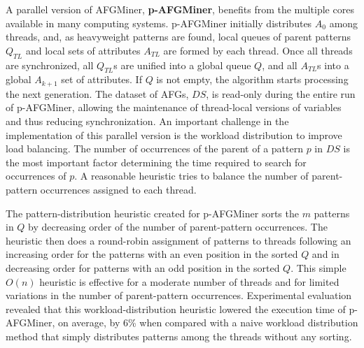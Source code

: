 A parallel version of AFGMiner, {\bf p-AFGMiner}, benefits from the multiple cores available in many computing systems. p-AFGMiner initially distributes $A_{0}$ among threads, and, as heavyweight patterns are found, local queues of parent patterns $Q_{TL}$ and local sets of attributes $A_{TL}$ are formed by each thread. Once all threads are synchronized, all $Q_{TL}$s are unified into a global queue $Q$, and all $A_{TL}$s into a global $A_{k+1}$ set of attributes. If $Q$ is not empty, the algorithm starts processing the next generation. The dataset of AFGs, $DS$, is read-only during the entire run of p-AFGMiner, allowing the maintenance of thread-local versions of variables and thus reducing synchronization. An important challenge in the implementation of this parallel version is the workload distribution to improve load balancing. The number of occurrences of the parent of a pattern $p$ in $DS$ is the most important factor determining the time required to search for occurrences of $p$. A reasonable heuristic tries to balance the number of parent-pattern occurrences assigned to each thread. 

The pattern-distribution heuristic created for p-AFGMiner sorts the $m$ patterns in $Q$ by decreasing order of the number of parent-pattern occurrences. The heuristic then does a round-robin assignment of patterns to threads following an increasing order for the patterns with an even position in the sorted $Q$ and in decreasing order for patterns with an odd position in the sorted $Q$. This simple $O(n)$ heuristic is effective for a moderate number of threads and for limited variations in the number of parent-pattern occurrences. Experimental evaluation revealed that this workload-distribution heuristic lowered the execution time of p-AFGMiner, on average, by 6\% when compared with a naive workload distribution method that simply distributes patterns among the threads without any sorting.


 


 
